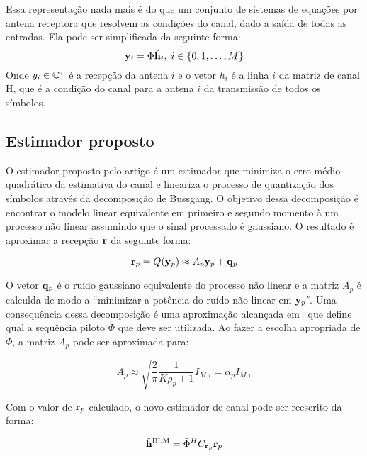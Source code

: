 \documentclass{article}
\begin{document}
	Essa representação nada mais é do que um conjunto de sistemas de equações por antena receptora que resolvem as condições do canal, dado a saída de todas as entradas. Ela pode ser simplificada da seguinte forma:
	\begin{equation}
			\mathbf{y}_i = \Phi \hat{\mathbf{h}}_i,\;i\in\{0,1,\dots,M\}
	\end{equation}
	Onde $y_i\in\mathbb{C}^\tau$ é a recepção da antena $i$ e o vetor $h_i$ é a linha $i$ da matriz de canal H, que é a condição do canal para a antena $i$ da transmissão de todos os símbolos. 

	\subsection{Estimador proposto}

	O estimador proposto pelo artigo é um estimador que minimiza o erro médio quadrático da estimativa do canal e lineariza o processo de quantização dos símbolos através da decomposição de Bussgang. O objetivo dessa decomposição é encontrar o modelo linear equivalente em primeiro e segundo momento à um processo não linear assumindo que o sinal processado é gaussiano. O resultado é aproximar a recepção $\mathbf{r}$ da seguinte forma:

	\begin{equation}
		\mathbf{r}_p = Q(\mathbf{y}_p) \approx A_p\mathbf{y}_p + \mathbf{q}_p
		\label{eq:decomposicao_bussgang}
	\end{equation}
	
	O vetor $\mathbf{q}_p$ é o ruído gaussiano equivalente do processo não linear e a matriz $A_p$ é calculda de modo a ``minimizar a potência do ruído não linear em $\mathbf{y}_p$''. Uma consequência dessa decomposição é uma aproximação alcançada em~\cite{li.etal_2017a} que define qual a sequência piloto $\Phi$ que deve ser utilizada. Ao fazer a escolha apropriada de $\Phi$, a matriz $A_p$ pode ser aproximada para:

	\begin{equation}
		A_p \approx \sqrt{\frac{2}{\pi}\frac{1}{K\rho_p+1}}I_{M.\tau} = \alpha_p I_{M.\tau}
		\label{eq:calculo_matriz_ap_simplificada}
	\end{equation}

	Com o valor de $\mathbf{r}_p$ calculado, o novo estimador de canal pode ser reescrito da forma:
	
	\begin{equation}
		\hat{\mathbf{h}}^{\text{BLM}}=\tilde{\Phi}^H C_{\mathbf{r}_p}\mathbf{r}_p
		\label{eq:estimador_bussgang}
	\end{equation}
	
\end{document}
